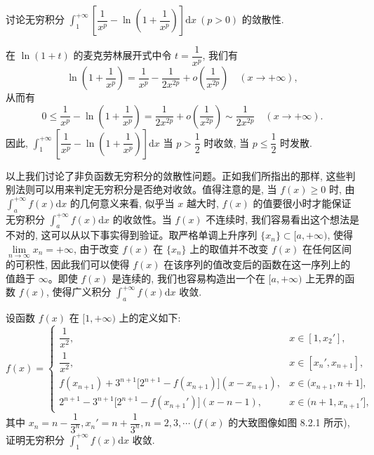 \begin{example}\label{example:ma-8-2-3}
讨论无穷积分 $\int_1^{+\infty}\left[\dfrac1{x^p}-\ln\left(1+\dfrac1{x^p}\right)\right]\mathrm dx\ (p>0)$ 的敛散性.
\end{example}


\begin{solve}
在 $\ln(1+t)$ 的麦克劳林展开式中令 $t=\dfrac1{x^p}$, 我们有
\[
  \ln\left(1+\frac1{x^p}\right)
  =
  \frac1{x^p}-\frac1{2x^{2p}}+o\left(\frac1{x^{2p}}\right)
  \quad(x\to+\infty),
\]
从而有
\[
  0\leq
  \frac1{x^p}-\ln\left(1+\frac1{x^p}\right)
  =
  \frac1{2x^{2p}}+o\left(\frac1{x^{2p}}\right)
  \sim
  \frac1{2x^{2p}}
  \quad(x\to+\infty).
\]
因此, $\int_1^{+\infty}\left[\dfrac1{x^p}-\ln\left(1+\dfrac1{x^p}\right)\right]\mathrm dx$ 当 $p>\dfrac12$ 时收敛, 当 $p\leq\dfrac12$ 时发散.

以上我们讨论了非负函数无穷积分的敛散性问题。正如我们所指出的那样, 这些判别法则可以用来判定无穷积分是否绝对收敛。值得注意的是, 当 $f(x)\geq0$ 时, 由 $\int_a^{+\infty}f(x)\mathrm dx$ 的几何意义来看, 似乎当 $x$ 越大时, $f(x)$ 的值要很小时才能保证无穷积分 $\int_a^{+\infty}f(x)\mathrm dx$ 的收敛性。当 $f(x)$ 不连续时, 我们容易看出这个想法是不对的, 这可以从以下事实得到验证。取严格单调上升序列 $\{x_n\}\subset[a,+\infty)$, 使得 $\lim\limits_{n\to\infty}x_n=+\infty$, 由于改变 $f(x)$ 在 $\{x_n\}$ 上的取值并不改变 $f(x)$ 在任何区间的可积性, 因此我们可以使得 $f(x)$ 在该序列的值改变后的函数在这一序列上的值趋于 $\infty$。即使 $f(x)$ 是连续的, 我们也容易构造出一个在 $[a,+\infty)$ 上无界的函数 $f(x)$, 使得广义积分 $\int_a^{+\infty}f(x)\mathrm dx$ 收敛.
\end{solve}


\begin{example}\label{example:ma-8-2-4}
设函数 $f(x)$ 在 $[1,+\infty)$ 上的定义如下:
\[
  f(x)=
  \begin{cases}
    \dfrac1{x^2}, & x\in[1,x_2'],\\
    \dfrac1{x^2}, & x\in[x_n',x_{n+1}],\\
    f(x_{n+1})+3^{n+1}\bigl[2^{n+1}-f(x_{n+1})\bigr](x-x_{n+1}), & x\in(x_{n+1},n+1],\\
    2^{n+1}-3^{n+1}\bigl[2^{n+1}-f(x_{n+1}')\bigr](x-n-1), & x\in(n+1,x_{n+1}'],
  \end{cases}
\]
其中 $x_n=n-\dfrac1{3^n},x_n'=n+\dfrac1{3^n},n=2,3,\cdots$ ($f(x)$ 的大致图像如图 8.2.1 所示), 证明无穷积分 $\int_1^{+\infty}f(x)\mathrm dx$ 收敛.
\end{example}


